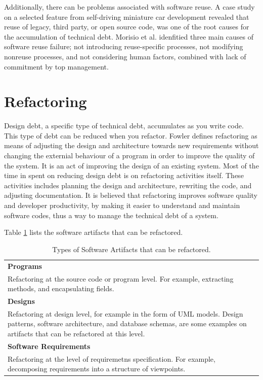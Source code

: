 Additionally, there can be problems associated with software reuse. A case study on a selected feature from self-driving miniature car development revealed that reuse of legacy, third party, or open source code, was one of the root causes for the accumulation of technical debt\cite{6974884}. Morisio et al.\cite{995420} idenfitied three main causes of software reuse failure; not introducing reuse-specific processes, not modifying nonreuse processes, and not considering human factors, combined with lack of commitment by top management.



\section{Refactoring}
Design debt, a specific type of technical debt, accumulates as you write code\cite{Zazworka:2011:PDD:1985362.1985372}. This type of debt can be reduced when you refactor. Fowler defines refactoring as means of adjusting the design and architecture towards new requirements without changing the externial behaviour of a program in order to improve the quality of the system\cite{1999:RID:311424}. It is an act of improving the design of an existing system\cite{Vliet:2008:SEP:1481475}. Most of the time in spent on reducing design debt is on refactoring activities itself. These activities includes planning the design and architecture, rewriting the code, and adjusting documentation\cite{Pressman:2009:SEP:1593949}. It is believed that refactoring improves software quality and developer productivity, by making it easier to understand and maintain software codes\cite{Kim:2012:FSR:2393596.2393655}, thus a way to manage the technical debt of a system. 

Table \ref{tab:refactorArtifacts} lists the software artifacts that can be refactored\cite{1265817}.

\begin{table}[ht!]
	\renewcommand{\arraystretch}{1.2}
	\centering	
	\begin{tabular}{p{}} \hline
		\textbf{Programs} \\Refactoring at the source code or program level. For example, extracting methods, and encapsulating fields. \\ \hline
		\textbf{Designs} \\
		Refactoring at design level, for example in the form of UML models. Design patterns, software architecture, and database schemas, are some examples on artifacts that can be refactored at this level. \\ \hline
		\textbf{Software Requirements} \\
		Refactoring at the level of requiremetns specification. For example, decomposing requirements into a structure of viewpoints. \\ \hline
	\end{tabular}
	\caption{Types of Software Artifacts that can be refactored.}
	\label{tab:refactorArtifacts}
\end{table}


